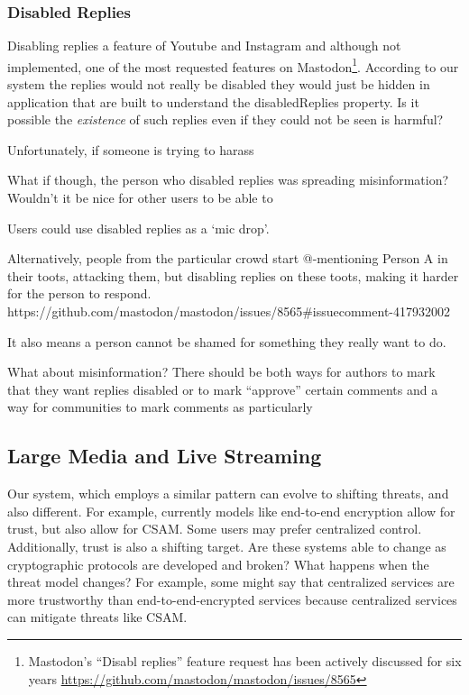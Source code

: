 \subsubsection{Disabled Replies}

Disabling replies a feature of Youtube and Instagram and although not
implemented, one of the most requested features on Mastodon\footnote{
    Mastodon's ``Disabl replies'' feature request has been actively discussed
    for six years
    \url{https://github.com/mastodon/mastodon/issues/8565}
}.
According to our system the replies would not really be disabled
they would just be hidden in application that are built to understand
the disabledReplies property.
Is it possible the \emph{existence} of such replies even if they could
not be seen is harmful?

Unfortunately, if someone is trying to harass

What if though, the person who disabled replies was spreading misinformation?
Wouldn't it be nice for other users to be able to

Users could use disabled replies as a `mic drop'.

Alternatively,
people from the particular crowd start
@-mentioning Person A in their toots, attacking them,
but disabling replies on these toots, making it harder
for the person to respond.
https://github.com/mastodon/mastodon/issues/8565#issuecomment-417932002

It also means a person cannot be shamed for something they really
want to do.

What about misinformation? There should be both ways for authors to
mark that they want replies disabled or to mark ``approve'' certain comments
and a way for communities to
mark comments as particularly

\subsection{Large Media and Live Streaming}


Our system, which employs a similar pattern can evolve to shifting threats,
and also different. For example, currently models like end-to-end encryption
allow for trust, but also allow for CSAM. Some users may prefer centralized control.
Additionally, trust is also a shifting target.
Are these systems able to change as cryptographic protocols
are developed and broken?
What happens when the threat model changes? For example,
some might say that centralized services are more trustworthy
than end-to-end-encrypted services because centralized services can
mitigate threats like CSAM.


